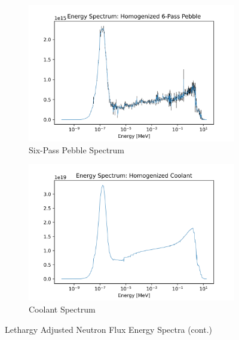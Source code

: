 \begin{figure}[H]\ContinuedFloat
\centering

\begin{subfigure}{0.95\textwidth}
  \includegraphics[width=0.95\linewidth]{figures/6_spec_homog}
  \caption{Six-Pass Pebble Spectrum}
  \label{fig:hom-six}
\end{subfigure}%

\begin{subfigure}{0.95\textwidth}
  \includegraphics[width=0.95\linewidth]{figures/cool_spec_homog}
  \caption{Coolant Spectrum}
  \label{fig:hom-cool}
\end{subfigure}%

\caption{Lethargy Adjusted Neutron Flux Energy Spectra (cont.)}
\end{figure}

